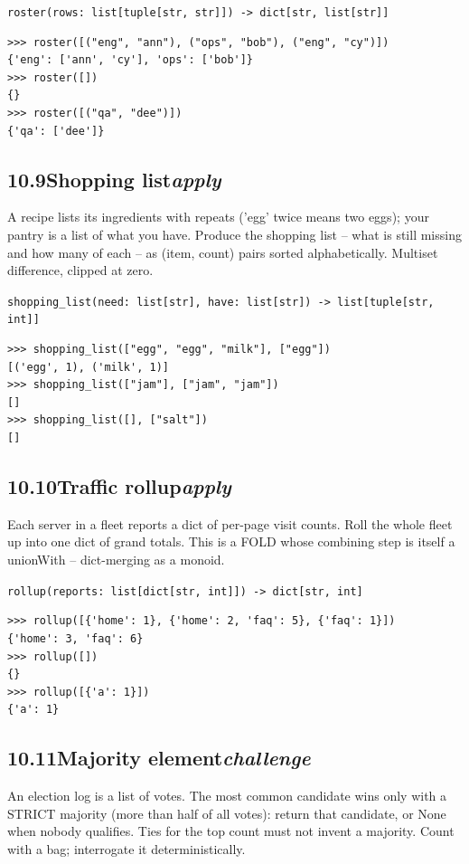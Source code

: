 \documentclass[10pt,letterpaper]{book}
\begin{document}
\noindent\texttt{roster(rows: list[tuple[str, str]]) -> dict[str, list[str]]}
\begin{lstlisting}[style=ex]
>>> roster([("eng", "ann"), ("ops", "bob"), ("eng", "cy")])
{'eng': ['ann', 'cy'], 'ops': ['bob']}
>>> roster([])
{}
>>> roster([("qa", "dee")])
{'qa': ['dee']}
\end{lstlisting}

\subsection*{10.9\quad Shopping list\hfill\textnormal{\textit{apply}}}
A recipe lists its ingredients with repeats ('egg' twice means two eggs); your pantry is a list of what you have. Produce the shopping list -- what is still missing and how many of each -- as (item, count) pairs sorted alphabetically. Multiset difference, clipped at zero.

\noindent\texttt{shopping\_list(need: list[str], have: list[str]) -> list[tuple[str, int]]}
\begin{lstlisting}[style=ex]
>>> shopping_list(["egg", "egg", "milk"], ["egg"])
[('egg', 1), ('milk', 1)]
>>> shopping_list(["jam"], ["jam", "jam"])
[]
>>> shopping_list([], ["salt"])
[]
\end{lstlisting}
\subsection*{10.10\quad Traffic rollup\hfill\textnormal{\textit{apply}}}
Each server in a fleet reports a dict of per-page visit counts. Roll the whole fleet up into one dict of grand totals. This is a FOLD whose combining step is itself a unionWith -- dict-merging as a monoid.

\noindent\texttt{rollup(reports: list[dict[str, int]]) -> dict[str, int]}
\begin{lstlisting}[style=ex]
>>> rollup([{'home': 1}, {'home': 2, 'faq': 5}, {'faq': 1}])
{'home': 3, 'faq': 6}
>>> rollup([])
{}
>>> rollup([{'a': 1}])
{'a': 1}
\end{lstlisting}
\subsection*{10.11\quad Majority element\hfill\textnormal{\textit{challenge}}}
An election log is a list of votes. The most common candidate wins only with a STRICT majority (more than half of all votes): return that candidate, or None when nobody qualifies. Ties for the top count must not invent a majority. Count with a bag; interrogate it deterministically.
\end{document}
